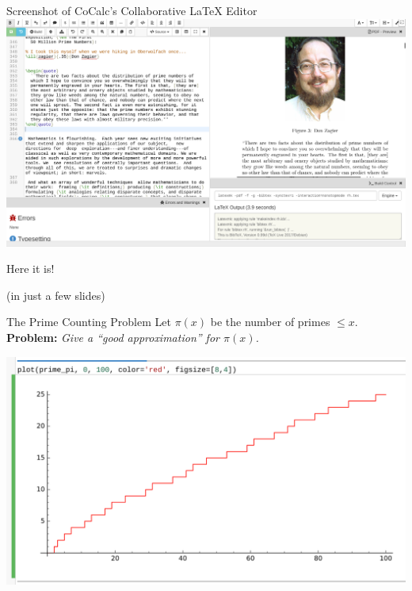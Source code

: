\documentclass{beamer}
\begin{document}
\begin{frame}{Screenshot of CoCalc's Collaborative \LaTeX{} Editor}
  \includegraphics[width=\textwidth]{pics/cocalc-latex}
\end{frame}

\begin{frame}{}
  \vfill
  \begin{center}
    \hrulefill
    \vfill
    \Huge\sc Here it is!
    \vfill
    \hrulefill
  \end{center}
  \vfill
  \begin{center}
    (in just a few slides)
  \end{center}
\end{frame}


\begin{frame}{The Prime Counting Problem}
  Let $\pi(x)$ be the number of primes $\leq x$.\\
  {\bf Problem:} {\em Give a ``good approximation'' for $\pi(x)$.}
  \vfill

  \includegraphics[width=.98\textwidth]{pics/prime-pi-100}

\end{frame}
\end{document}
